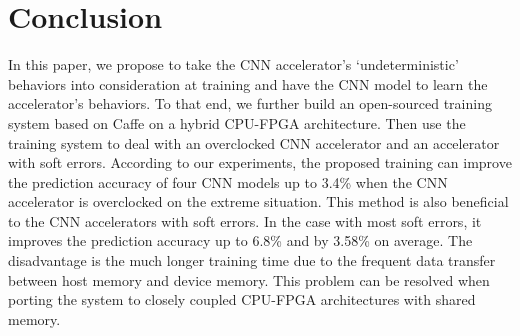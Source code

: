 \section{Conclusion} \label{sec:Conclusion}
In this paper, we propose to take the CNN accelerator’s ‘undeterministic’ behaviors into consideration 
at training and have the CNN model to learn the accelerator’s behaviors. To that end, we further build 
an open-sourced training system based on Caffe on a hybrid CPU-FPGA architecture. Then use the training 
system to deal with an overclocked CNN accelerator and an accelerator with soft errors. According to our 
experiments, the proposed training can improve the prediction accuracy of four CNN models up to 3.4\% when 
the CNN accelerator is overclocked on the extreme situation. This method is also beneficial to the CNN 
accelerators with soft errors. In the case with most soft errors, it improves the prediction accuracy up 
to 6.8\% and by 3.58\% on average. The disadvantage is the much longer training time due to the frequent 
data transfer between host memory and device memory. This problem can be resolved when porting the system 
to closely coupled CPU-FPGA architectures with shared memory.



